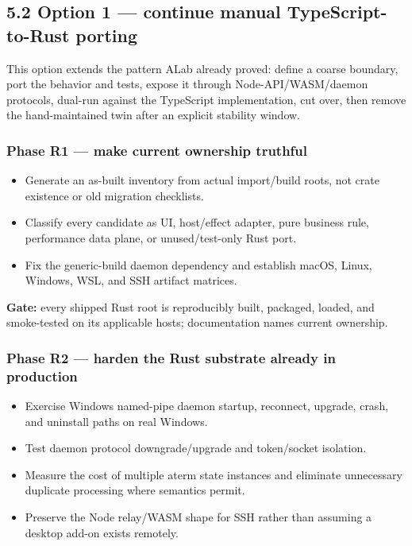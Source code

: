 \documentclass[
  10pt,
  letterpaper,
]{article}
\providecommand{\tightlist}{%
  \setlength{\itemsep}{0pt}\setlength{\parskip}{0pt}}
\begin{document}
\subsection{5.2 Option 1 --- continue manual TypeScript-to-Rust
porting}\label{52-option-1--continue-manual-typescript-to-rust-porting}

This option extends the pattern ALab already proved: define a coarse
boundary, port the behavior and tests, expose it through
Node-API/WASM/daemon protocols, dual-run against the TypeScript
implementation, cut over, then remove the hand-maintained twin after an
explicit stability window.

\subsubsection{Phase R1 --- make current ownership
truthful}\label{phase-r1--make-current-ownership-truthful}

\begin{itemize}
\tightlist
\item
  Generate an as-built inventory from actual import/build roots, not
  crate existence or old migration checklists.
\item
  Classify every candidate as UI, host/effect adapter, pure business
  rule, performance data plane, or unused/test-only Rust port.
\item
  Fix the generic-build daemon dependency and establish macOS, Linux,
  Windows, WSL, and SSH artifact matrices.
\end{itemize}

\textbf{Gate:} every shipped Rust root is reproducibly built, packaged,
loaded, and smoke-tested on its applicable hosts; documentation names
current ownership.

\subsubsection{Phase R2 --- harden the Rust substrate already in
production}\label{phase-r2--harden-the-rust-substrate-already-in-production}

\begin{itemize}
\tightlist
\item
  Exercise Windows named-pipe daemon startup, reconnect, upgrade, crash,
  and uninstall paths on real Windows.
\item
  Test daemon protocol downgrade/upgrade and token/socket isolation.
\item
  Measure the cost of multiple aterm state instances and eliminate
  unnecessary duplicate processing where semantics permit.
\item
  Preserve the Node relay/WASM shape for SSH rather than assuming a
  desktop add-on exists remotely.
\end{itemize}
\end{document}
